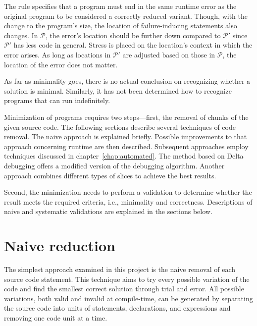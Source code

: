 The rule specifies that a program must end in the same runtime error 
as the original program to be considered a correctly reduced variant.
Though, with the change to the program's size, the location 
of failure-inducing statements also changes.
In $\mathcal{P}$, the error's location should be further down compared to 
$\mathcal{P'}$ since $\mathcal{P'}$ has less code in general.
Stress is placed on the location's context in which the error arises.
As long as locations in $\mathcal{P'}$ are adjusted based on those in 
$\mathcal{P}$, the location of the error does not matter.


As far as minimality goes, there is no actual conclusion on recognizing 
whether a solution is minimal.
Similarly, it has not been determined how to recognize programs that can 
run indefinitely.

Minimization of programs requires two steps—first, the removal of chunks 
of the given source code. 
The following sections describe several techniques of code removal. 
The naive approach is explained briefly. 
Possible improvements to that approach concerning runtime are then described. 
Subsequent approaches employ techniques discussed in 
chapter~\ref{chap:automated}. 
The method based on Delta debugging offers a modified version of 
the debugging algorithm. 
Another approach combines different types of slices to achieve the best 
results.

Second, the minimization needs to perform a validation to determine whether 
the result meets the required criteria, i.e., minimality and correctness. 
Descriptions of naive and systematic validations are explained in the 
sections below.

\section{Naive reduction}\label{chap:naive}

The simplest approach examined in this project is the naive removal of each 
source code statement.
This technique aims to try every possible variation of the code and find 
the smallest correct solution through trial and error.
All possible variations, both valid and invalid at compile-time, can be 
generated by separating the source code into units of statements, 
declarations, and expressions and removing one code unit at a time.

